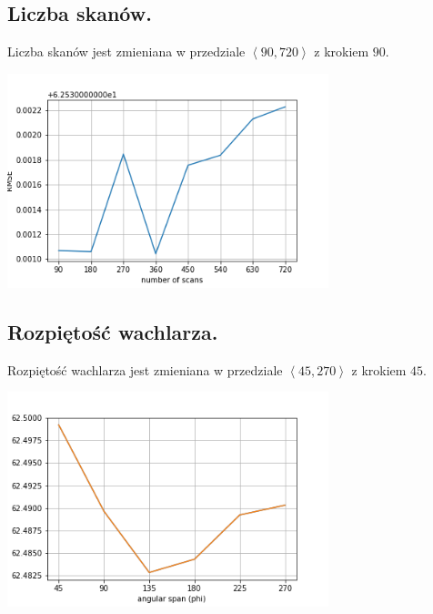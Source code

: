 \documentclass[paper=a4, fontsize=11pt]{scrartcl}
\begin{document}
	\subsection{Liczba skanów.}
	
	Liczba skanów jest zmieniana w przedziale $\left<90, 720 \right>$ z krokiem $90$.
	
	\begin{center}
		\includegraphics[width=0.7\textwidth]{scans.png}
	\end{center}
	\subsection{Rozpiętość wachlarza.}
	
	Rozpiętość wachlarza jest zmieniana w przedziale $\left<45, 270 \right>$ z krokiem $45$.
	
	\begin{center}
		\includegraphics[width=0.7\textwidth]{phi.png}
	\end{center}
\end{document}
